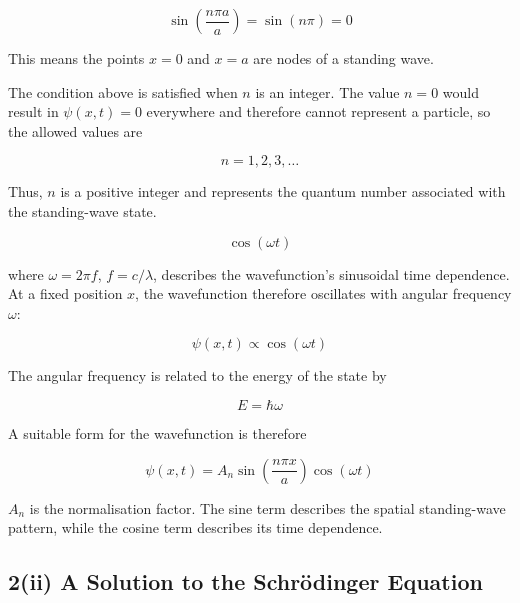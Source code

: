 \documentclass{article}
\begin{document}
\begin{equation*}
\sin\left(\frac{n\pi a}{a}\right) = \sin(n\pi) = 0
\end{equation*}

This means the points $x=0$ and $x=a$ are nodes of a standing wave.

\vspace{1\baselineskip}

The condition above is satisfied when $n$ is an integer. The value
$n=0$ would result in $\psi(x,t)=0$ everywhere and therefore cannot
represent a particle, so the allowed values are

\begin{equation*}
\boxed{n=1,2,3,\ldots}
\end{equation*}

Thus, $n$ is a positive integer and represents the quantum number
associated with the standing-wave state.

\begin{equation*}
\cos(\omega t)
\end{equation*}

where $\omega = 2\pi f$, $f=c/\lambda$, describes the wavefunction's sinusoidal time dependence. At a fixed position $x$, the wavefunction therefore oscillates with angular frequency $\omega$:

\begin{equation*}
\psi(x,t)\propto\cos(\omega t)
\end{equation*}

The angular frequency is related to the energy of the state by

\begin{equation*}
E=\hbar\omega
\end{equation*}

\vspace{1\baselineskip}

A suitable form for the wavefunction is therefore

\begin{equation*}
\boxed{\psi(x,t) = A_n\sin\left(\frac{n\pi x}{a}\right)\cos(\omega t)}
\end{equation*}

$A_n$ is the normalisation factor. The sine term describes the
spatial standing-wave pattern, while the cosine term
describes its time dependence.


\subsection*{2(ii) A Solution to the Schrödinger Equation}
\end{document}
